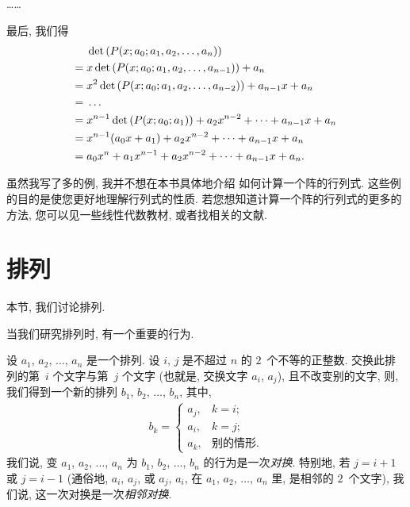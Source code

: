 \documentclass[../libro.tex]{subfiles}
\begin{document}
\begin{example}
    ……

    最后, 我们得
    \begin{align*}
        &
        \det {(P(x; a_0; a_1, a_2, \dots, a_n))}
        \\
        = {} &
        x \det {(P(x; a_0; a_1, a_2, \dots, a_{n-1}))} + a_n
        \\
        = {} &
        x^2 \det {(P(x; a_0; a_1, a_2, \dots, a_{n-2}))} + a_{n-1} x + a_n
        \\
        = {} &
        \dots
        \\
        = {} &
        x^{n-1} \det {(P(x; a_0; a_1))} + a_2 x^{n-2} + \dots + a_{n-1} x + a_n
        \\
        = {} &
        x^{n-1} (a_0 x + a_1) + a_2 x^{n-2} + \dots + a_{n-1} x + a_n
        \\
        = {} &
        a_0 x^n + a_1 x^{n-1} + a_2 x^{n-2} + \dots + a_{n-1} x + a_n.
        \qedhere
    \end{align*}
\end{example}

虽然我写了多的例,
我并不想在本书具体地介绍%
如何计算一个阵的行列式.
这些例的目的是使您更好地理解行列式的性质.
若您想知道计算一个阵的行列式的更多的方法,
您可以见一些线性代数教材,
或者找相关的文献.

\section{排列}


本节, 我们讨论排列.

当我们研究排列时, 有一个重要的行为.

\begin{definition}[对换]
    设 \(a_1\), \(a_2\), \(\dots\), \(a_n\) 是一个排列.
    设 \(i\), \(j\) 是不超过 \(n\) 的 \(2\)~个不等的正整数.
    交换此排列的第~\(i\) 个文字与第~\(j\) 个文字
    (也就是, 交换文字 \(a_i\), \(a_j\)),
    且不改变别的文字,
    则, 我们得到一个新的排列
    \(b_1\), \(b_2\), \(\dots\), \(b_n\),
    其中,
    \begin{align*}
        b_k =
        \begin{cases}
            a_j, & k = i;       \\
            a_i, & k = j;       \\
            a_k, & \text{别的情形}.
        \end{cases}
    \end{align*}
    我们说, 变 \(a_1\), \(a_2\), \(\dots\), \(a_n\)
    为 \(b_1\), \(b_2\), \(\dots\), \(b_n\)
    的行为是一次\emph{对换}.
    特别地, 若 \(j = i + 1\) 或
    \(j = i - 1\)
    (通俗地, %
    \(a_i\), \(a_j\), 或 \(a_j\), \(a_i\), 在
    \(a_1\), \(a_2\), \(\dots\), \(a_n\) 里,
    是相邻的 \(2\)~个文字), %
    我们说, 这一次对换是一次\emph{相邻对换}.
\end{definition}
\end{document}
